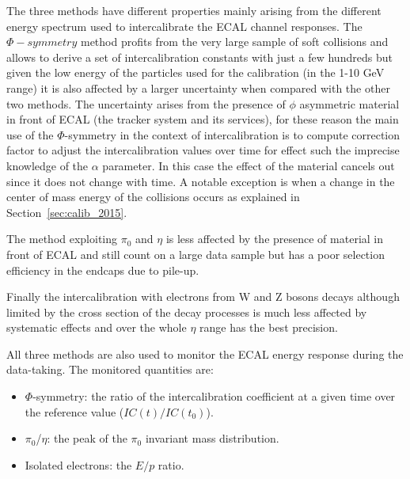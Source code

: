 The three methods have different properties mainly arising from the different energy spectrum used to intercalibrate the ECAL
channel responses.
The $\Phi-symmetry$ method profits from the very large sample of soft collisions and allows to derive a set of intercalibration
constants with just a few hundreds \pbinv but given the low energy of the particles used for the calibration (in the 1-10 GeV range)
it is also affected by a larger uncertainty when compared with the other two methods.
The uncertainty arises from the presence of $\phi$ asymmetric material in front of ECAL
(the tracker system and its services), for these reason the main use of
the $\Phi$-symmetry in the context of intercalibration is to compute correction factor to adjust the intercalibration values
over time for effect such the imprecise knowledge of the $\alpha$ parameter. In this case the effect of the material cancels
out since it does not change with time. A notable exception is when a change in the center of mass energy of the collisions
occurs as explained in Section~\ref{sec:calib_2015}.

The method exploiting $\pi_0$ and $\eta$ is less affected by the presence of material in front of ECAL and
still count on a large data sample but has a poor selection efficiency in the endcaps due to pile-up.

Finally the intercalibration with electrons from W and Z bosons decays although limited by the cross section
of the decay processes is much less affected by systematic effects and over the whole $\eta $ range has the best
precision.

All three methods are also used to monitor the ECAL energy response during the data-taking. The monitored quantities are:
\begin{itemize}
\item $\Phi$-symmetry: the ratio of the intercalibration coefficient at a given time over the reference value ($IC(t)/IC(t_0)$).
\item $\pi_0$/$\eta$: the peak of the $\pi_0$ invariant mass distribution.
\item Isolated electrons: the $E/p$ ratio.
\end{itemize}

